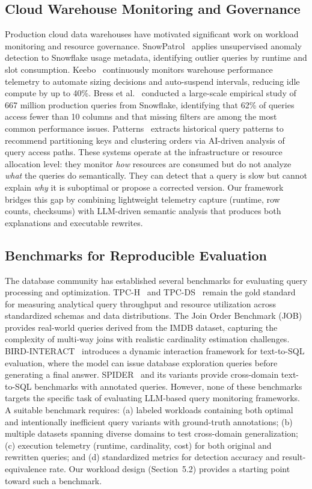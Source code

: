 \documentclass[conference]{IEEEtran}
\begin{document}
\subsection{Cloud Warehouse Monitoring and Governance}
Production cloud data warehouses have motivated significant work on workload monitoring and resource governance. SnowPatrol~\cite{snowpatrol2023} applies unsupervised anomaly detection to Snowflake usage metadata, identifying outlier queries by runtime and slot consumption. Keebo~\cite{keebo2023} continuously monitors warehouse performance telemetry to automate sizing decisions and auto-suspend intervals, reducing idle compute by up to 40\%. Bress et al.~\cite{bress2025snowflake} conducted a large-scale empirical study of 667 million production queries from Snowflake, identifying that 62\% of queries access fewer than 10 columns and that missing filters are among the most common performance issues. Patterns~\cite{patterns2026} extracts historical query patterns to recommend partitioning keys and clustering orders via AI-driven analysis of query access paths. These systems operate at the infrastructure or resource allocation level: they monitor \textit{how} resources are consumed but do not analyze \textit{what} the queries do semantically. They can detect that a query is slow but cannot explain \textit{why} it is suboptimal or propose a corrected version. Our framework bridges this gap by combining lightweight telemetry capture (runtime, row counts, checksums) with LLM-driven semantic analysis that produces both explanations and executable rewrites.

\subsection{Benchmarks for Reproducible Evaluation}
The database community has established several benchmarks for evaluating query processing and optimization. TPC-H~\cite{tpch} and TPC-DS~\cite{tpcds} remain the gold standard for measuring analytical query throughput and resource utilization across standardized schemas and data distributions. The Join Order Benchmark (JOB)~\cite{leis2015job} provides real-world queries derived from the IMDB dataset, capturing the complexity of multi-way joins with realistic cardinality estimation challenges. BIRD-INTERACT~\cite{huo2025bird} introduces a dynamic interaction framework for text-to-SQL evaluation, where the model can issue database exploration queries before generating a final answer. SPIDER~\cite{yu2018spider} and its variants provide cross-domain text-to-SQL benchmarks with annotated queries. However, none of these benchmarks targets the specific task of evaluating LLM-based query monitoring frameworks. A suitable benchmark requires: (a) labeled workloads containing both optimal and intentionally inefficient query variants with ground-truth annotations; (b) multiple datasets spanning diverse domains to test cross-domain generalization; (c) execution telemetry (runtime, cardinality, cost) for both original and rewritten queries; and (d) standardized metrics for detection accuracy and result-equivalence rate. Our workload design (Section~5.2) provides a starting point toward such a benchmark.
\end{document}
